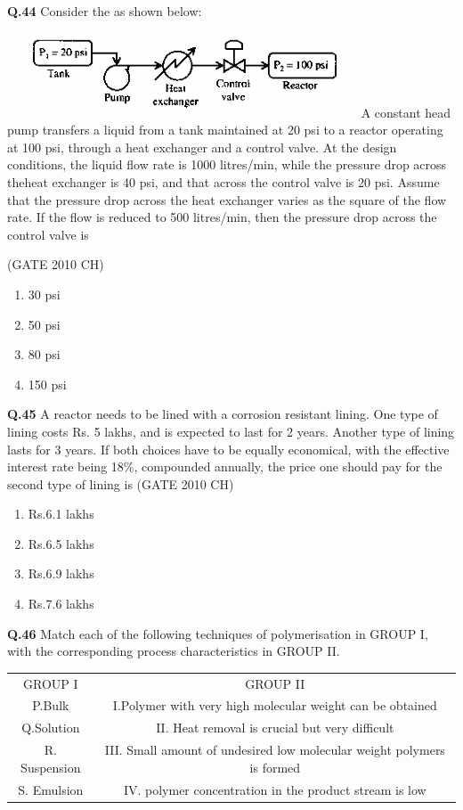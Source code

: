 \documentclass[journal,12pt,onecolumn]{exam}
\theoremstyle{remark}
\begin{document}
 \noindent
 \textbf{Q.44}
  Consider the as shown below:
  
  \includegraphics[width=0.5\linewidth]{images/Q.44 image.png}
    A constant head pump transfers a liquid from a tank maintained at 20 psi to a reactor operating at 100 psi, through a heat exchanger and a control valve. At the design conditions, the liquid flow rate is 1000 litres/min, while the pressure drop across theheat exchanger is 40 psi, and that across the control valve is 20 psi. Assume that the pressure drop across the heat exchanger varies as the square of the flow rate. If the flow is reduced to 500 litres/min, then the pressure drop across the control valve is
    
\hfill{(GATE 2010 CH)}\\

    \begin{enumerate}
        \item 30 psi
        \item 50 psi
        \item 80 psi
        \item 150 psi
    \end{enumerate}

   \noindent
   \textbf{Q.45}
   A reactor needs to be lined with a corrosion resistant lining. One type of lining costs Rs. 5 lakhs, and is expected to last for 2 years. Another type of lining lasts for 3 years. If both choices have to be equally economical, with the effective interest rate being 18\%, compounded annually, the price one should pay for the second type of lining is
   \hfill{(GATE 2010 CH)}\\

   \begin{enumerate}
       \item Rs.6.1 lakhs
       \item Rs.6.5 lakhs
       \item Rs.6.9 lakhs
       \item Rs.7.6 lakhs
   \end{enumerate}


\noindent
\textbf{Q.46}
Match each of the following techniques of polymerisation in GROUP I, with the corresponding process characteristics in GROUP II.

  
      \begin{tabular}{c|c}
       GROUP I  & GROUP II \\
       P.Bulk    & I.Polymer with very high molecular weight can be obtained\\
       Q.Solution & II. Heat removal is crucial but very difficult\\
       R. Suspension & III. Small amount of undesired low molecular weight polymers is formed\\
       S. Emulsion & IV. polymer concentration in the product stream is low
      \end{tabular}
      
\end{document}

